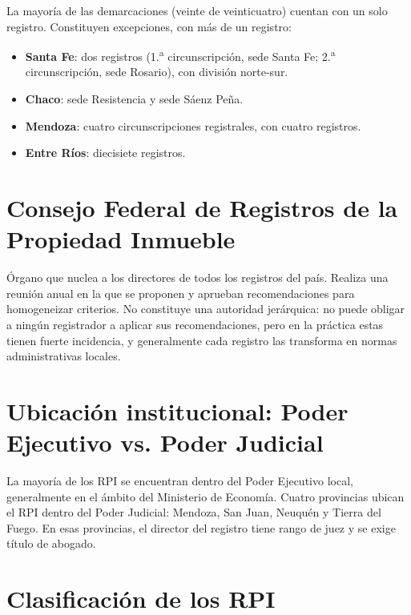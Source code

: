 \documentclass[12pt,oneside]{book}
\begin{document}
La mayoría de las demarcaciones (veinte de veinticuatro) cuentan con un solo registro. Constituyen excepciones, con más de un registro:

\begin{itemize}
\item \textbf{Santa Fe}: dos registros (1.\textsuperscript{a} circunscripción, sede Santa Fe; 2.\textsuperscript{a} circunscripción, sede Rosario), con división norte-sur.
\item \textbf{Chaco}: sede Resistencia y sede Sáenz Peña. %
\item \textbf{Mendoza}: cuatro circunscripciones registrales, con cuatro registros.
\item \textbf{Entre Ríos}: diecisiete registros.
\end{itemize}

\section{Consejo Federal de Registros de la Propiedad Inmueble}

Órgano que nuclea a los directores de todos los registros del país. Realiza una reunión anual en la que se proponen y aprueban recomendaciones para homogeneizar criterios. No constituye una autoridad jerárquica: no puede obligar a ningún registrador a aplicar sus recomendaciones, pero en la práctica estas tienen fuerte incidencia, y generalmente cada registro las transforma en normas administrativas locales.

\section{Ubicación institucional: Poder Ejecutivo vs. Poder Judicial}

La mayoría de los RPI se encuentran dentro del Poder Ejecutivo local, generalmente en el ámbito del Ministerio de Economía. Cuatro provincias ubican el RPI dentro del Poder Judicial: Mendoza, San Juan, Neuquén y Tierra del Fuego. En esas provincias, el director del registro tiene rango de juez y se exige título de abogado.

\section{Clasificación de los RPI}
\end{document}

